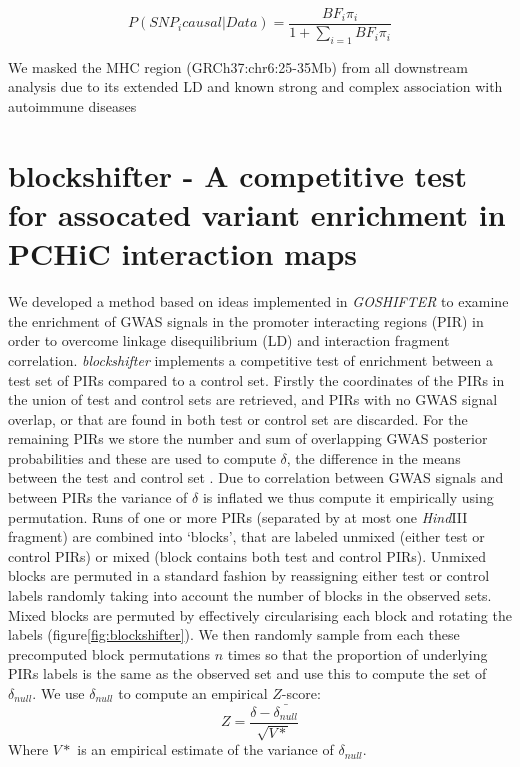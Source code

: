 \documentclass[a4paper,11pt]{book}
\begin{document}

\begin{equation}
	P(SNP_{i} causal | Data) = \frac{BF_{i}\pi_{i}}{1 + \sum_{i=1} BF_{i}\pi_{i}}
\end{equation}

We masked the MHC region (GRCh37:chr6:25-35Mb) from all downstream analysis due to its extended LD and known strong and complex association with autoimmune diseases
\section{blockshifter - A competitive test for assocated variant enrichment in PCHiC interaction maps}
We developed a method based on ideas implemented in \textit{GOSHIFTER} to examine the enrichment of GWAS signals in the promoter interacting regions (PIR) in order to overcome linkage disequilibrium (LD) and interaction fragment correlation. \textit{blockshifter}  implements a competitive test of enrichment between a test set of PIRs compared to a control set. Firstly the coordinates of the PIRs in the union of test and control sets are retrieved, and PIRs with no GWAS signal overlap, or that are found in both test or control set are discarded. For the remaining PIRs we store the number and sum of overlapping GWAS posterior probabilities and these are used to compute $\delta$, the difference in the means between the test and control set . Due to correlation between GWAS signals and between PIRs the variance of $\delta$ is inflated we thus compute it empirically using permutation.  Runs of one or more PIRs (separated by at most one \textit{Hind}III fragment) are combined into ‘blocks’, that are labeled unmixed (either test or control PIRs) or mixed (block contains both test and control PIRs).  Unmixed blocks are permuted in a standard fashion by reassigning either test or control labels randomly taking into account the number of blocks in the observed sets. Mixed blocks are permuted by effectively circularising each block and rotating the labels (figure\ref{fig:blockshifter}). We then randomly sample from each these precomputed block permutations $n$ times so that the proportion of underlying PIRs labels is the same as the observed set and use this to compute the set of $\delta_{null}$. We use $\delta_{null}$ to compute an empirical $Z$-score:
\begin{equation}
Z = \frac{\delta - \bar{\delta_{null}}}{\sqrt{V*}}
\end{equation}
Where $V*$ is an empirical estimate of the variance of $\delta_{null}$. 
\end{document}
